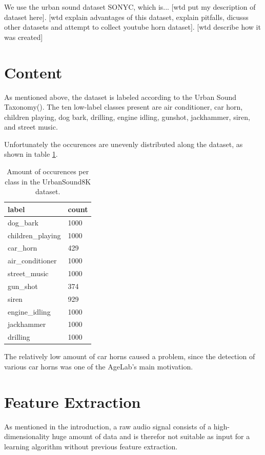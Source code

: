 We use the urban sound dataset SONYC, which is... [wtd put my description of dataset here]. [wtd explain advantages of this dataset, explain pitfalls, dicusss other datasets and attempt to collect youtube horn dataset].  [wtd describe how it was created]

\section{Content}

As mentioned above, the dataset is labeled according to the Urban Sound Taxonomy(\cite{Salamon:UrbanSound:ACMMM:14}). The ten low-label classes present are air conditioner, car horn, children playing, dog bark, drilling, engine idling, gunshot, jackhammer, siren, and street music.

Unfortunately the occurences are unevenly distributed along the dataset, as shown in table \ref{tbl:urbansound8kdistribution}. 

\begin{table}[h]
\centering
\begin{tabular}{ll}
\hline
label & count \\
\hline
dog_bark & 1000 \\
children_playing & 1000 \\
car_horn & 429 \\
air_conditioner & 1000 \\
street_music & 1000 \\
gun_shot & 374 \\
siren & 929 \\
engine_idling & 1000 \\
jackhammer & 1000 \\
drilling & 1000
\end{tabular}
\caption{Amount of occurences per class in the UrbanSound8K dataset.}
\label{tbl:urbansound8kdistribution}
\par
\end{table}

The relatively low amount of car horns caused a problem, since the detection of various car horns was one of the AgeLab's main motivation.


\section{Feature Extraction}

As mentioned in the introduction, a raw audio signal consists of a high-dimensionality huge amount of data and is therefor not suitable as input for a learning algorithm without previous feature extraction.


